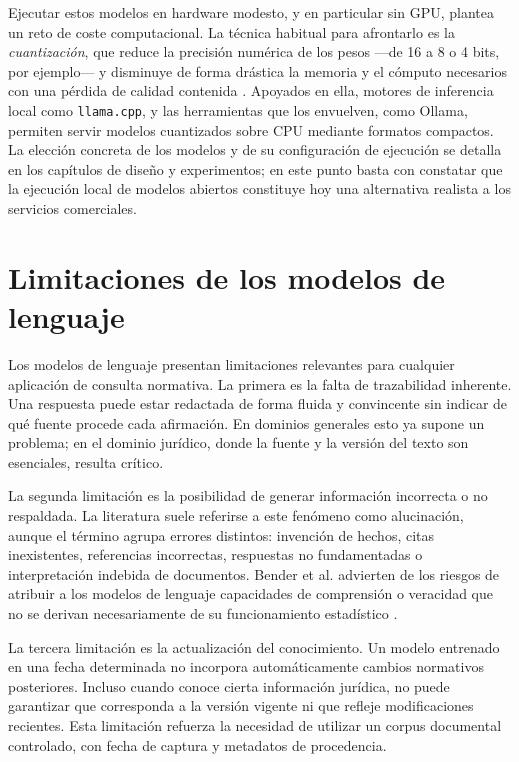 Ejecutar estos modelos en hardware modesto, y en particular sin GPU, plantea un reto de coste computacional. La técnica habitual para afrontarlo es la \emph{cuantización}, que reduce la precisión numérica de los pesos —de 16 a 8 o 4 bits, por ejemplo— y disminuye de forma drástica la memoria y el cómputo necesarios con una pérdida de calidad contenida \cite{frantar2023gptq}. Apoyados en ella, motores de inferencia local como \texttt{llama.cpp}, y las herramientas que los envuelven, como Ollama, permiten servir modelos cuantizados sobre CPU mediante formatos compactos. La elección concreta de los modelos y de su configuración de ejecución se detalla en los capítulos de diseño y experimentos; en este punto basta con constatar que la ejecución local de modelos abiertos constituye hoy una alternativa realista a los servicios comerciales.

\section{Limitaciones de los modelos de lenguaje}
\label{sec:limitaciones-llm}

Los modelos de lenguaje presentan limitaciones relevantes para cualquier aplicación de consulta normativa. La primera es la falta de trazabilidad inherente. Una respuesta puede estar redactada de forma fluida y convincente sin indicar de qué fuente procede cada afirmación. En dominios generales esto ya supone un problema; en el dominio jurídico, donde la fuente y la versión del texto son esenciales, resulta crítico.

La segunda limitación es la posibilidad de generar información incorrecta o no respaldada. La literatura suele referirse a este fenómeno como alucinación, aunque el término agrupa errores distintos: invención de hechos, citas inexistentes, referencias incorrectas, respuestas no fundamentadas o interpretación indebida de documentos. Bender et al. advierten de los riesgos de atribuir a los modelos de lenguaje capacidades de comprensión o veracidad que no se derivan necesariamente de su funcionamiento estadístico \cite{bender2021stochastic}.

La tercera limitación es la actualización del conocimiento. Un modelo entrenado en una fecha determinada no incorpora automáticamente cambios normativos posteriores. Incluso cuando conoce cierta información jurídica, no puede garantizar que corresponda a la versión vigente ni que refleje modificaciones recientes. Esta limitación refuerza la necesidad de utilizar un corpus documental controlado, con fecha de captura y metadatos de procedencia.

